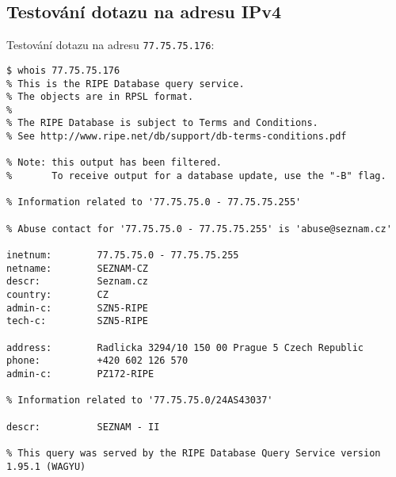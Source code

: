 \documentclass[a4paper, 11pt]{article}
\begin{document}
\subsection{Testování dotazu na adresu IPv4}
Testování dotazu na adresu \verb|77.75.75.176|:
\begin{lstlisting}
$ whois 77.75.75.176
% This is the RIPE Database query service.
% The objects are in RPSL format.
%
% The RIPE Database is subject to Terms and Conditions.
% See http://www.ripe.net/db/support/db-terms-conditions.pdf

% Note: this output has been filtered.
%       To receive output for a database update, use the "-B" flag.

% Information related to '77.75.75.0 - 77.75.75.255'

% Abuse contact for '77.75.75.0 - 77.75.75.255' is 'abuse@seznam.cz'

inetnum:        77.75.75.0 - 77.75.75.255
netname:        SEZNAM-CZ
descr:          Seznam.cz
country:        CZ
admin-c:        SZN5-RIPE
tech-c:         SZN5-RIPE

address:        Radlicka 3294/10 150 00 Prague 5 Czech Republic
phone:          +420 602 126 570
admin-c:        PZ172-RIPE

% Information related to '77.75.75.0/24AS43037'

descr:          SEZNAM - II

% This query was served by the RIPE Database Query Service version 1.95.1 (WAGYU)


\end{lstlisting}
\end{document}
